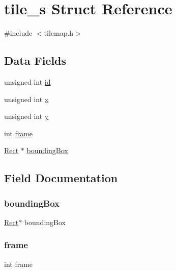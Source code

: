\hypertarget{structtile__s}{}\section{tile\+\_\+s Struct Reference}
\label{structtile__s}


{\ttfamily \#include $<$tilemap.\+h$>$}

\subsection*{Data Fields}
\begin{DoxyCompactItemize}
\item 
unsigned int \hyperlink{structtile__s_ab7ce6f462afaf105224b0ca772a33c43}{id}
\item 
unsigned int \hyperlink{structtile__s_a676e0da0ef83bbbdf42538e54b97506b}{x}
\item 
unsigned int \hyperlink{structtile__s_ac30de26db5f6d1c18c63913729adca7d}{y}
\item 
int \hyperlink{structtile__s_ad30f972f2e6e3e5ecab0dee38ae6cdb8}{frame}
\item 
\hyperlink{shape_8h_a44e2d24ab2a21b90d03880cab9cc6d16}{Rect} $\ast$ \hyperlink{structtile__s_a3d49780e142d5f067cdd71be48ad284d}{bounding\+Box}
\end{DoxyCompactItemize}


\subsection{Field Documentation}
\mbox{\label{structtile__s_a3d49780e142d5f067cdd71be48ad284d}} 
\subsubsection{\texorpdfstring{bounding\+Box}{boundingBox}}
{\footnotesize\ttfamily \hyperlink{shape_8h_a44e2d24ab2a21b90d03880cab9cc6d16}{Rect}$\ast$ bounding\+Box}

\mbox{\label{structtile__s_ad30f972f2e6e3e5ecab0dee38ae6cdb8}} 
\subsubsection{\texorpdfstring{frame}{frame}}
{\footnotesize\ttfamily int frame}


